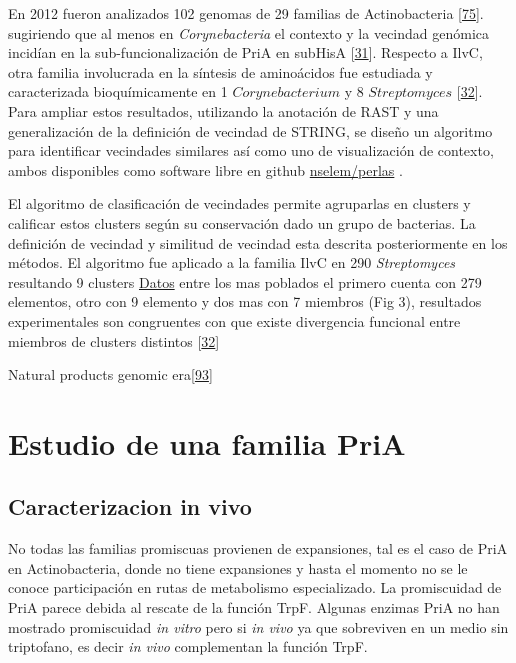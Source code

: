 \documentclass[12pt,twoside]{reedthesis}
\begin{document}
  En 2012 fueron analizados 102 genomas de 29 familias de Actinobacteria
  {[}\protect\hyperlink{ref-noda_tesis_2012}{75}{]}. sugiriendo que al
  menos en \emph{Corynebacteria} el contexto y la vecindad genómica
  incidían en la sub-funcionalización de PriA en subHisA
  {[}\protect\hyperlink{ref-noda-garcia_evolution_2013}{31}{]}. Respecto a
  IlvC, otra familia involucrada en la síntesis de aminoácidos fue
  estudiada y caracterizada bioquímicamente en 1 \(Corynebacterium\) y 8
  \(Streptomyces\)
  {[}\protect\hyperlink{ref-verdel-aranda_molecular_2015}{32}{]}. Para
  ampliar estos resultados, utilizando la anotación de RAST y una
  generalización de la definición de vecindad de STRING, se diseño un
  algoritmo para identificar vecindades similares así como uno de
  visualización de contexto, ambos disponibles como software libre en
  github \href{https://github.com/nselem/perlas}{nselem/perlas} .
  
  El algoritmo de clasificación de vecindades permite agruparlas en
  clusters y calificar estos clusters según su conservación dado un grupo
  de bacterias. La definición de vecindad y similitud de vecindad esta
  descrita posteriormente en los métodos. El algoritmo fue aplicado a la
  familia IlvC en 290 \emph{Streptomyces} resultando 9 clusters
  \href{http://148.247.230.43/nselem/CONTEXTS/REL_St275/ilvC/Contextos.php}{Datos}
  entre los mas poblados el primero cuenta con 279 elementos, otro con 9
  elemento y dos mas con 7 miembros (Fig 3), resultados experimentales son
  congruentes con que existe divergencia funcional entre miembros de
  clusters distintos
  {[}\protect\hyperlink{ref-verdel-aranda_molecular_2015}{32}{]}
  
  Natural products genomic
  era{[}\protect\hyperlink{ref-harvey_re-emergence_2015}{93}{]}
  
  \section{Estudio de una familia PriA}\label{estudio-de-una-familia-pria}
  
  \subsection{Caracterizacion in vivo}\label{caracterizacion-in-vivo}
  
  No todas las familias promiscuas provienen de expansiones, tal es el
  caso de PriA en Actinobacteria, donde no tiene expansiones y hasta el
  momento no se le conoce participación en rutas de metabolismo
  especializado. La promiscuidad de PriA parece debida al rescate de la
  función TrpF. Algunas enzimas PriA no han mostrado promiscuidad \emph{in
  vitro} pero si \emph{in vivo} ya que sobreviven en un medio sin
  triptofano, es decir \emph{in vivo} complementan la función TrpF.
  
\end{document}
